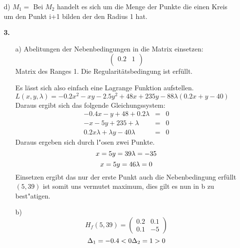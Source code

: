 \documentclass[a4paper,11pt,fleqn]{scrartcl}
\begin{document}
\begin{enumerate}
        \item[d)]
            $M_1 =$ 
            Bei $M_2$ handelt es sich um die Menge der Punkte die einen Kreis um den Punkt i+1 bilden der den Radius 1 hat.
    \item[\textbf{3.}]
        \begin{enumerate}
            \item[a)]
                Abelitungen der Nebenbedingungen in die Matrix einsetzen:
                \[ 
                \begin{pmatrix}
                    0.2 & 1 \\
                \end{pmatrix}
                \]
                Matrix des Ranges 1. Die Regularitätsbedingung ist erfüllt.

                Es lässt sich also einfach eine Lagrange Funktion aufstellen. \\
                $L(x,y,\lambda) = -0.2x^2 - xy - 2.5y^2 + 48x + 235y - 88 \lambda(0.2x+y-40)$ \\
                Daraus ergibt sich das folgende Gleichungssystem:
                \begin{eqnarray*}
                    -0.4x - y+48 + 0.2 \lambda &=& 0\\
                    -x - 5y + 235 + \lambda &=& 0\\
                    0.2x\lambda + \lambda y -40\lambda &=& 0 
                \end{eqnarray*} 
                Daraus ergeben sich durch l"osen zwei Punkte.
                \[x = 5  \\ 
                y = 39 \\
                \lambda = -35\]
                \[x = 5  \\ 
                y = 46 \\
                \lambda = 0\]     
                Einsetzen ergibt das nur der erste Punkt auch die Nebenbedingung erfüllt $(5,39)$ ist somit uns vermutet maximum, dies gilt es nun in b zu best"atigen.
            \item[b)]
                \[H_f(5, 39) =
                \begin{pmatrix}
                    0.2 & 0.1 \\
                    0.1 & -5
                \end{pmatrix} \]
                \[
                \Delta_1 = -0.4 < 0 \\
                \Delta_2 = 1 > 0
                \]

\end{enumerate}
\end{enumerate}
\end{document}
